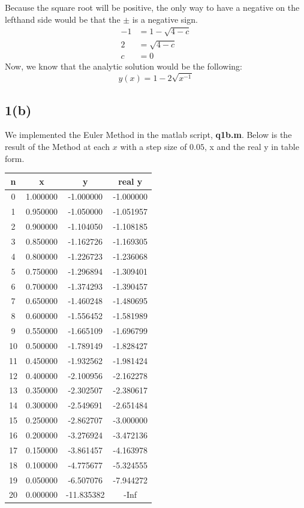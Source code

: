 \documentclass{article}
\begin{document}
Because the square root will be positive, the only way to have a negative on the lefthand side would be that the $\pm$ is a negative sign.
\begin{equation*}
\begin{aligned}
-1 &= 1 - \sqrt{4 - c}\\
2 &= \sqrt{4 - c}\\
c & = 0 
\end{aligned}
\end{equation*}
Now, we know that the analytic solution would be the following:
\begin{equation*}
y(x) = 1 - 2 \sqrt{x^{-1}}
\end{equation*}
\subsection*{1(b)}
We implemented the Euler Method in the matlab script, \textbf{q1b.m}. Below is the result of the Method at each $x$ with a step size of $0.05$, x and the real y in table form.
\begin{center}
\begin{tabular}{|c|c|c|c|}
\hline
n & x & y & real y \\ \hline
0 & 1.000000 & -1.000000 & -1.000000 \\ \hline 
1 & 0.950000 & -1.050000 & -1.051957 \\ \hline 
2 & 0.900000 & -1.104050 & -1.108185 \\ \hline 
3 & 0.850000 & -1.162726 & -1.169305 \\ \hline 
4 & 0.800000 & -1.226723 & -1.236068 \\ \hline 
5 & 0.750000 & -1.296894 & -1.309401 \\ \hline 
6 & 0.700000 & -1.374293 & -1.390457 \\ \hline 
7 & 0.650000 & -1.460248 & -1.480695 \\ \hline 
8 & 0.600000 & -1.556452 & -1.581989 \\ \hline 
9 & 0.550000 & -1.665109 & -1.696799 \\ \hline 
10 & 0.500000 & -1.789149 & -1.828427 \\ \hline 
11 & 0.450000 & -1.932562 & -1.981424 \\ \hline 
12 & 0.400000 & -2.100956 & -2.162278 \\ \hline 
13 & 0.350000 & -2.302507 & -2.380617 \\ \hline 
14 & 0.300000 & -2.549691 & -2.651484 \\ \hline 
15 & 0.250000 & -2.862707 & -3.000000 \\ \hline 
16 & 0.200000 & -3.276924 & -3.472136 \\ \hline 
17 & 0.150000 & -3.861457 & -4.163978 \\ \hline 
18 & 0.100000 & -4.775677 & -5.324555 \\ \hline 
19 & 0.050000 & -6.507076 & -7.944272 \\ \hline 
20 & 0.000000 & -11.835382 & -Inf \\ \hline 
\end{tabular}
\end{center}
\end{document}
